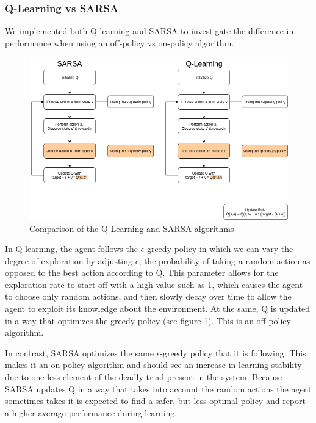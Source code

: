 \subsubsection{Q-Learning vs SARSA}\label{sec:ql_sarsa}
We implemented both Q-learning and SARSA to investigate the difference in performance when using an off-policy vs on-policy algorithm. 

\begin{figure}[h]
    \centering
    \includegraphics[width=1\linewidth]{img/SARSA_QL.png}
    \caption{Comparison of the Q-Learning and SARSA algorithms}
    \label{fig:ql_sarsa}
\end{figure}

In Q-learning, the agent follows the $\epsilon$-greedy policy in which we can vary the degree of exploration by adjusting $\epsilon$, the probability of taking a random action as opposed to the best action according to Q. This parameter allows for the exploration rate to start off with a high value such as 1, which causes the agent to choose only random actions, and then slowly decay over time to allow the agent to exploit its knowledge about the environment. At the same, Q is updated in a way that optimizes the greedy policy (see figure \ref{fig:ql_sarsa}). This is an off-policy algorithm.

In contrast, SARSA optimizes the same $\epsilon$-greedy policy that it is following. This makes it an on-policy algorithm and should see an increase in learning stability due to one less element of the deadly triad present in the system. Because SARSA updates Q in a way that takes into account the random actions the agent sometimes takes it is expected to find a safer, but less optimal policy \citep{sutton_barto_2018} and report a higher average performance during learning.


